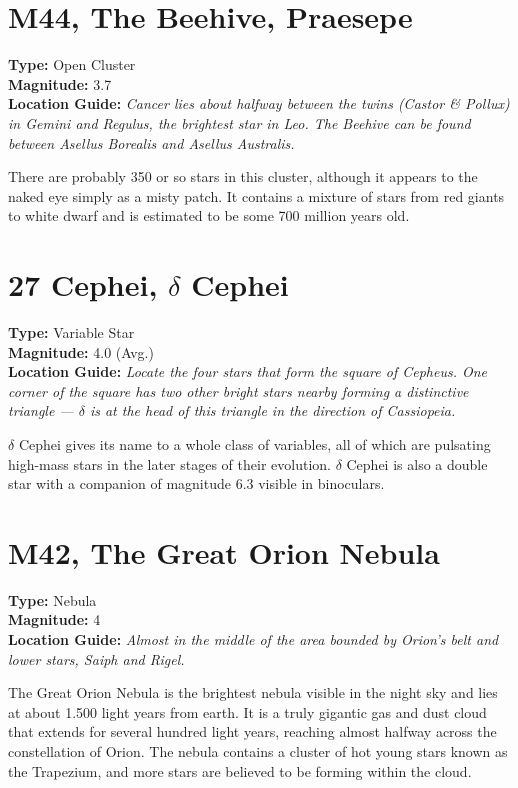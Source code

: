 \section{M44, The Beehive, Praesepe}
\textbf{Type:} Open Cluster \\
\textbf{Magnitude:} 3.7 \\ 
\textbf{Location Guide:} \textit{Cancer lies about halfway between the twins (Castor \& Pollux) in Gemini and Regulus, the brightest star in Leo. The Beehive can be found between Asellus Borealis and Asellus Australis.} 

There are probably 350 or so stars in this cluster, although it appears
to the naked eye simply as a misty patch. It contains a mixture of
stars from red giants to white dwarf and is estimated to be some 700
million years old.

\section{27 Cephei, \texorpdfstring{$\delta$}{delta} Cephei} 
\textbf{Type:} Variable Star \\
\textbf{Magnitude:} 4.0 (Avg.) \\ 
\textbf{Location Guide:} \textit{Locate the four stars that form the square of Cepheus. One corner of the square has two other bright stars nearby forming a distinctive triangle --- $\delta$ is at the head of this triangle in the direction of Cassiopeia.} 

$\delta$ Cephei gives its name to a whole class of variables, all of
which are pulsating high-mass stars in the later stages of their
evolution. $\delta$ Cephei is also a double star with a companion of
magnitude 6.3 visible in binoculars.

\section{M42, The Great Orion Nebula} 
\textbf{Type:} Nebula \\
\textbf{Magnitude:} 4 \\
\textbf{Location Guide:} \textit{Almost in the middle of the area bounded by Orion's belt and lower stars, Saiph and Rigel.} 

The Great Orion Nebula is the brightest nebula visible in the night
sky and lies at about 1.500 light years from earth. It is a truly
gigantic gas and dust cloud that extends for several hundred light
years, reaching almost halfway across the constellation of Orion. The
nebula contains a cluster of hot young stars known as the Trapezium,
and more stars are believed to be forming within the cloud.

